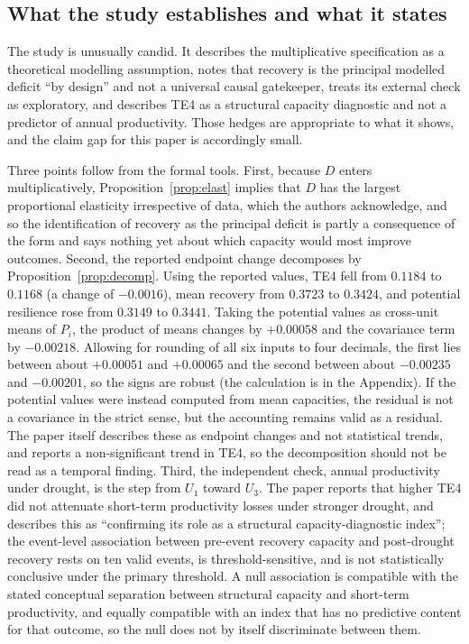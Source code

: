 \documentclass[11pt]{article}
\theoremstyle{definition}
\theoremstyle{remark}
\begin{document}
\subsection{What the study establishes and what it states}

The study is unusually candid. It describes the multiplicative specification as a theoretical modelling assumption, notes that recovery is the principal modelled deficit ``by design'' and not a universal causal gatekeeper, treats its external check as exploratory, and describes TE4 as a structural capacity diagnostic and not a predictor of annual productivity. Those hedges are appropriate to what it shows, and the claim gap for this paper is accordingly small.

Three points follow from the formal tools. First, because $D$ enters multiplicatively, Proposition~\ref{prop:elast} implies that $D$ has the largest proportional elasticity irrespective of data, which the authors acknowledge, and so the identification of recovery as the principal deficit is partly a consequence of the form and says nothing yet about which capacity would most improve outcomes. Second, the reported endpoint change decomposes by Proposition~\ref{prop:decomp}. Using the reported values, TE4 fell from $0.1184$ to $0.1168$ (a change of $-0.0016$), mean recovery from $0.3723$ to $0.3424$, and potential resilience rose from $0.3149$ to $0.3441$. Taking the potential values as cross-unit means of $P_i$, the product of means changes by $+0.00058$ and the covariance term by $-0.00218$. Allowing for rounding of all six inputs to four decimals, the first lies between about $+0.00051$ and $+0.00065$ and the second between about $-0.00235$ and $-0.00201$, so the signs are robust (the calculation is in the Appendix). If the potential values were instead computed from mean capacities, the residual is not a covariance in the strict sense, but the accounting remains valid as a residual. The paper itself describes these as endpoint changes and not statistical trends, and reports a non-significant trend in TE4, so the decomposition should not be read as a temporal finding. Third, the independent check, annual productivity under drought, is the step from $U_1$ toward $U_3$. The paper reports that higher TE4 did not attenuate short-term productivity losses under stronger drought, and describes this as ``confirming its role as a structural capacity-diagnostic index''; the event-level association between pre-event recovery capacity and post-drought recovery rests on ten valid events, is threshold-sensitive, and is not statistically conclusive under the primary threshold. A null association is compatible with the stated conceptual separation between structural capacity and short-term productivity, and equally compatible with an index that has no predictive content for that outcome, so the null does not by itself discriminate between them.
\end{document}
